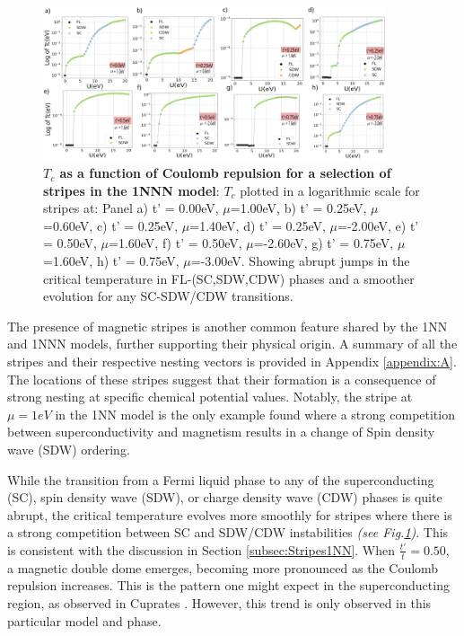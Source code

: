 \documentclass[12pt]{article}
\begin{document}
\begin{figure}[htbp]  %
    \centering
    \includegraphics[width=0.90\textwidth]{1NNNstripes.png}  %
    \caption{\textbf{$T_c$ as a function of Coulomb repulsion for a selection of stripes in the 1NNN model}: $T_c$ plotted in
    a logarithmic scale for stripes at:  Panel a) t' = 0.00eV, $\mu$=1.00eV, b) t' = 0.25eV, $\mu$=0.60eV, c) t' = 0.25eV, $\mu$=1.40eV,
    d) t' = 0.25eV, $\mu$=-2.00eV,
    e) t' = 0.50eV, $\mu$=1.60eV,
    f) t' = 0.50eV, $\mu$=-2.60eV,
    g) t' = 0.75eV, $\mu$=1.60eV, 
    h) t' = 0.75eV, $\mu$=-3.00eV.
    Showing abrupt jumps in the critical temperature in FL-(SC,SDW,CDW) phases and a smoother
    evolution for any SC-SDW/CDW transitions.  }
    \label{fig:1NNNStripes}
\end{figure}

\noindent The presence of magnetic stripes is another common feature shared by the 1NN and 1NNN models, 
further supporting their physical origin.
A summary of all the stripes and their respective nesting vectors is provided 
in Appendix \ref{appendix:A}. The locations of these
stripes suggest that their formation is a consequence of strong nesting at specific 
chemical potential values. 
Notably, the stripe at $\mu=1 eV$ in the 1NN model is the only example found where a strong 
competition between superconductivity and magnetism results in a change of Spin density wave (SDW) ordering.




\medskip 

\noindent While the transition from a Fermi liquid phase to any of the superconducting (SC), spin density wave (SDW), or charge density wave (CDW) phases is quite abrupt, the critical temperature
evolves more smoothly for stripes where there is a strong competition between SC and SDW/CDW instabilities \textit{(see Fig.\ref{fig:1NNNStripes})}. 
This is consistent with the discussion in Section \ref{subsec:Stripes1NN}. When $\frac{t'}{t} = 0.50$, a magnetic double dome emerges, becoming more pronounced as the Coulomb repulsion increases. 
This is the pattern one might expect in the superconducting region, as observed in Cuprates \cite{taillefer2010scattering}. 
However, this trend is only observed in this particular model and phase.
\end{document}

